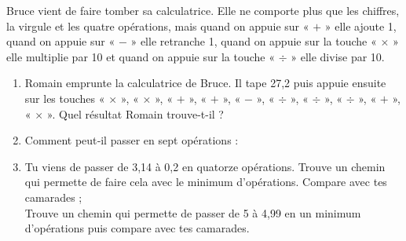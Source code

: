 \begin{enigme}
Bruce vient de faire tomber sa calculatrice. Elle ne comporte plus que les chiffres, la virgule et les quatre opérations, mais quand on appuie sur « $+$ » elle ajoute 1, quand on appuie sur « $-$ » elle retranche 1, quand on appuie sur la touche « $\times$ » elle multiplie par 10 et quand on appuie sur la touche « $\div$ » elle divise par 10. \\[-1em]
\begin{enumerate}
 \item Romain emprunte la calculatrice de Bruce. Il tape 27,2 puis appuie ensuite sur les touches « $\times$ », « $\times$ », « $+$ », « $+$ », « $-$ », « $\div$ », « $\div$ », « $\div$ », « $+$ », « $\times$ ». Quel résultat Romain trouve-t-il ?
 \item Comment peut‑il passer en sept opérations :    
 \item Tu viens de passer de 3,14 à 0,2 en quatorze opérations. Trouve un chemin qui permette de faire cela avec le minimum d'opérations. Compare avec tes camarades ; \\[0.5em]
Trouve un chemin qui permette de passer de 5 à 4,99 en un minimum d'opérations puis compare avec tes camarades.
 \end{enumerate}
\end{enigme} 
